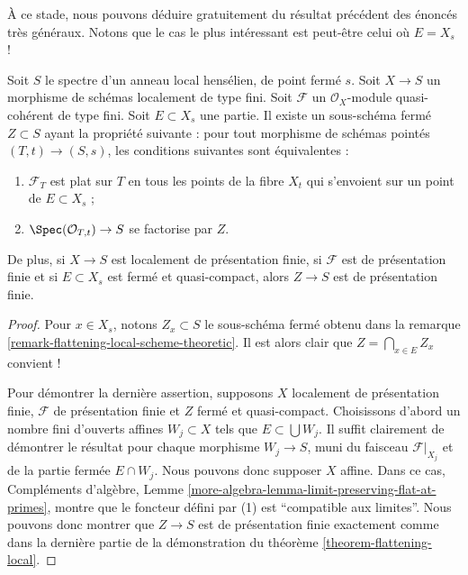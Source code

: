 \noindent
À ce stade, nous pouvons déduire gratuitement du résultat précédent des énoncés
très généraux. Notons que le cas le plus intéressant est peut-être
celui où $E = X_s$ !

\begin{lemma}
\label{lemma-freebie}
Soit $S$ le spectre d'un anneau local hensélien, de point fermé $s$.
Soit $X \to S$ un morphisme de schémas localement de type fini.
Soit $\mathcal{F}$ un $\mathcal{O}_X$-module quasi-cohérent de type fini.
Soit $E \subset X_s$ une partie. Il existe un sous-schéma fermé
$Z \subset S$ ayant la propriété suivante : pour tout morphisme de schémas pointés
$(T, t) \to (S, s)$, les conditions suivantes sont équivalentes :
\begin{enumerate}
\item $\mathcal{F}_T$ est plat sur $T$ en tous les points de la fibre
$X_t$ qui s'envoient sur un point de $E \subset X_s$ ;
\item $\Spec(\mathcal{O}_{T, t}) \to S$ se factorise par $Z$.
\end{enumerate}
De plus, si $X \to S$ est localement de présentation finie,
si $\mathcal{F}$ est de présentation finie et si $E \subset X_s$ est
fermé et quasi-compact, alors $Z \to S$ est de présentation finie.
\end{lemma}

\begin{proof}
Pour $x \in X_s$, notons $Z_x \subset S$ le sous-schéma fermé obtenu dans la
remarque \ref{remark-flattening-local-scheme-theoretic}.
Il est alors clair que $Z = \bigcap_{x \in E} Z_x$ convient !

\medskip\noindent
Pour démontrer la dernière assertion, supposons $X$ localement de présentation finie,
$\mathcal{F}$ de présentation finie et $Z$ fermé et quasi-compact.
Choisissons d'abord un nombre fini d'ouverts affines $W_j \subset X$ tels que
$E \subset \bigcup W_j$. Il suffit clairement de démontrer le
résultat pour chaque morphisme $W_j \to S$, muni du faisceau $\mathcal{F}|_{X_j}$
et de la partie fermée $E \cap W_j$. Nous pouvons donc supposer $X$ affine.
Dans ce cas,
Compléments d'algèbre, Lemme \ref{more-algebra-lemma-limit-preserving-flat-at-primes},
montre que le foncteur défini par (1) est ``compatible aux limites''.
Nous pouvons donc montrer que $Z \to S$ est de présentation finie exactement
comme dans la dernière partie de la démonstration du
théorème \ref{theorem-flattening-local}.
\end{proof}


